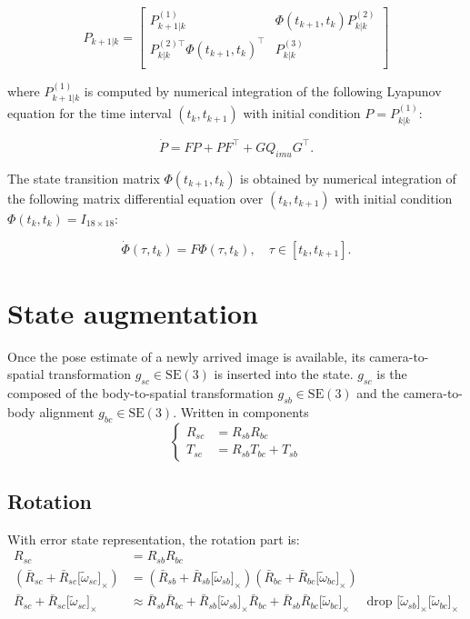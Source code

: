 \documentclass[letter,10pt]{article}
\newcommand{\SE}[1]{ \mathrm{SE(#1)} }
\newcommand{\asym}[1]{{\lbrack #1\rbrack}_\times{}}
\begin{document}
\begin{equation}
    P_{k+1|k} =
    \begin{bmatrix}
        P_{k+1|k}^{(1)} & \Phi(t_{k + 1}, t_k) P_{k|k}^{(2)} \\
        P_{k|k}^{(2)\top}\Phi(t_{k + 1}, t_k)^\top & P_{k|k}^{(3)}  \\
    \end{bmatrix}
    \label{eq:covariance-propagation}
\end{equation}

where $P_{k+1|k}^{(1)}$ is computed by numerical integration of the following Lyapunov equation for the time interval $(t_k, t_{k+1})$ with initial condition $P=P_{k|k}^{(1)}$:

\begin{equation}
    \dot{P} = F P + P F^\top + G Q_{imu} G^\top.
\label{eq:lyapunov}
\end{equation}

The state transition matrix $\Phi(t_{k+1}, t_k)$ is obtained by numerical integration of the following matrix differential equation over $(t_k, t_{k+1})$ with initial condition $\Phi(t_k, t_k)=I_{18\times 18}$:

\begin{equation}
    \dot{\Phi}(\tau, t_k) = F \Phi(\tau, t_k), \quad\tau \in [t_k, t_{k+1}].
\end{equation}

\section{State augmentation}
Once the pose estimate of a newly arrived image is available, its camera-to-spatial transformation $g_{sc} \in \SE{3}$ is inserted into the state. $g_{sc}$ is the composed of the body-to-spatial transformation $g_{sb} \in \SE{3}$ and the camera-to-body alignment $g_{bc} \in \SE{3}$. Written in components
\begin{equation}
\begin{cases}
R_{sc} &= R_{sb} R_{bc}\\
T_{sc} &= R_{sb} T_{bc} + T_{sb}
\end{cases}
\end{equation}

\subsection{Rotation}
With error state representation, the rotation part is:
\begin{equation}
 \begin{aligned}
R_{sc} &= R_{sb} R_{bc} \\
 (\bar R_{sc} + \bar R_{sc} \asym{\tilde\omega_{sc}}) &= 
 (\bar R_{sb} + \bar R_{sb} \asym{\tilde\omega_{sb}}) (\bar R_{bc} + \bar R_{bc} \asym{\tilde\omega_{bc}}) \\
 \bar R_{sc} + \bar R_{sc}\asym{\tilde \omega_{sc}} &\approx \bar R_{sb} \bar R_{bc} 
 + \bar R_{sb} \asym{\tilde \omega_{sb}} \bar R_{bc} + \bar R_{sb} \bar R_{bc} \asym{\tilde\omega_{bc}} \quad \text{ drop } \asym{\tilde\omega_{sb}}\asym{\tilde\omega_{bc}}
 \end{aligned}
\end{equation}
\end{document}
